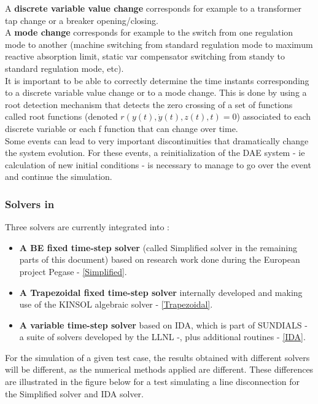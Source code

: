 \documentclass[a4paper, 12pt]{report}
\begin{document}
A \textbf{discrete variable value change} corresponds for example to a transformer tap change or a breaker opening/closing. \\

A \textbf{mode change} corresponds for example to the switch from one regulation mode to another (machine switching from standard regulation mode to maximum reactive absorption limit, static var compensator switching from standy to standard regulation mode, etc). \\

It is important to be able to correctly determine the time instants corresponding to a discrete variable value change or to a mode change. This is done by using a root detection mechanism that detects the zero crossing of a set of functions called root functions (denoted $r(y(t), \dot{y}(t), z(t), t) = 0$) associated to each discrete variable or each f function that can change over time. \\

Some events can lead to very important discontinuities that dramatically change the system evolution. For these events, a reinitialization of the \ac{DAE} system - ie calculation of new initial conditions - is necessary to manage to go over the event and continue the simulation. \\

\subsubsection[Solvers in Dynawo]{Solvers in \Dynawo}

Three solvers are currently integrated into \Dynawo:
\begin{itemize}
\item \textbf{A \ac{BE} fixed time-step solver} (called Simplified solver in the remaining parts of this document) based on research work done during the European project Pegase \cite{Pegase_Report, Pegase_Events, Pegase_IEEE_GM} - \ref{Simplified}.
\item \textbf{A Trapezoidal fixed time-step solver} internally developed and making use of the \ac{KINSOL} algebraic solver - \ref{Trapezoidal}.
\item \textbf{A variable time-step solver} based on IDA, which is part of \ac{SUNDIALS} - a suite of solvers developed by the \ac{LLNL} -, plus additional routines \cite{hindmarsh2005sundials} - \ref{IDA}.
\end{itemize}

For the simulation of a given test case, the results obtained with different solvers will be different, as the numerical methods applied are different. These differences are illustrated in the figure below for a test simulating a line disconnection for the Simplified solver and IDA solver.
\end{document}
